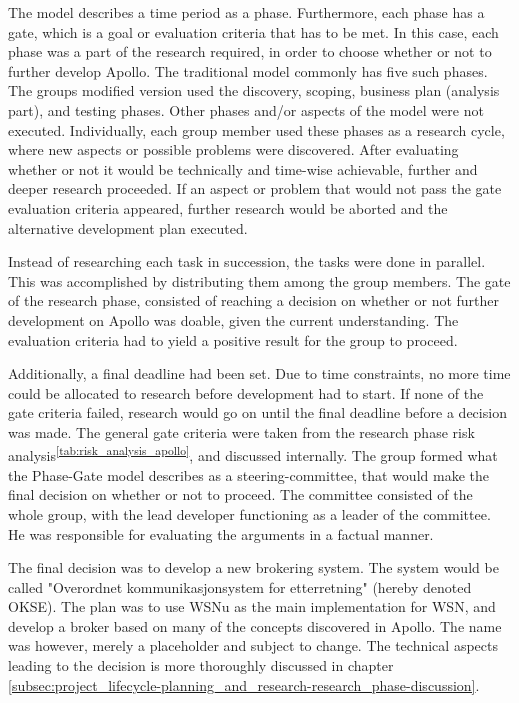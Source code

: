 The model describes a time period as a phase. Furthermore, each phase has a gate, which is a goal or evaluation criteria that has to be met. In this case, each phase was a part of the research required, in order to choose whether or not to further develop Apollo. The traditional model commonly has five such phases. The groups modified version used the discovery, scoping, business plan (analysis part), and testing phases. Other phases and/or aspects of the model were not executed. Individually, each group member used these phases as a research cycle, where new aspects or possible problems were discovered. After evaluating whether or not it would be technically and time-wise achievable, further and deeper research proceeded. If an aspect or problem that would not pass the gate evaluation criteria appeared, further research would be aborted and the alternative development plan executed.

Instead of researching each task in succession, the tasks were done in parallel. This was accomplished by distributing them among the group members. The gate of the research phase, consisted of reaching a decision on whether or not further development on Apollo was doable, given the current understanding. The evaluation criteria had to yield a positive result for the group to proceed.

Additionally, a final deadline had been set. Due to time constraints, no more time could be allocated to research before development had to start. If none of the gate criteria failed, research would go on until the final deadline before a decision was made. The general gate criteria were taken from the research phase risk analysis\textsuperscript{\ref{tab:risk_analysis_apollo}}, and discussed internally. The group formed what the Phase-Gate model describes as a steering-committee, that would make the final decision on whether or not to proceed. The committee consisted of the whole group, with the lead developer functioning as a leader of the committee. He was responsible for evaluating the arguments in a factual manner. 

The final decision was to develop a new brokering system. The system would be called "Overordnet kommunikasjonsystem for etterretning" (hereby denoted OKSE). The plan was to use WSNu as the main implementation for WSN, and develop a broker based on many of the concepts discovered in Apollo. The name was however, merely a placeholder and subject to change. The technical aspects leading to the decision is more thoroughly discussed in chapter \ref{subsec:project_lifecycle-planning_and_research-research_phase-discussion}.


